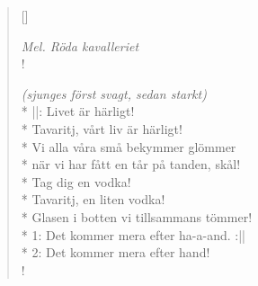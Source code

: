 
\settowidth{\versewidth}{Vi alla våra små bekymmer glömmer}



\begin{verse}[\versewidth]

\flagverse{}
\emph{Mel. Röda kavalleriet}\\!

\emph{(sjunges först svagt, sedan starkt)}\\* 
||: Livet är härligt!\\*
Tavaritj, vårt liv är härligt!\\*
Vi alla våra små bekymmer glömmer\\*
när vi har fått en tår på tanden, skål!\\*
Tag dig en vodka!\\*
Tavaritj, en liten vodka!\\*
Glasen i botten vi tillsammans tömmer!\\*
1: Det kommer mera efter ha-a-and. :||\\*
2: Det kommer mera efter hand!\\!




\end{verse}

